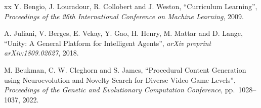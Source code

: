 \documentclass[a4paper,12pt,oneside]{book}
\begin{document}
\begin{thebibliography}{xx}
	Y. Bengio, J. Louradour, R. Collobert and J. Weston, ``Curriculum Learning'',
	{\em Proceedings of the 26th International Conference on Machine Learning}, 2009.

	A. Juliani, V. Berges, E. Vckay, Y. Gao, H. Henry, M. Mattar and D. Lange, ``Unity: A General Platform for Intelligent Agents'',
	{\em arXiv preprint arXiv:1809.02627}, 2018.

	M. Beukman, C. W. Cleghorn and S. James, ``Procedural Content Generation using Neuroevolution and Novelty Search for Diverse Video Game Levels'',
	{\em Proceedings of the Genetic and Evolutionary Computation Conference}, pp.~1028--1037, 2022.

\end{thebibliography}
\end{document}
